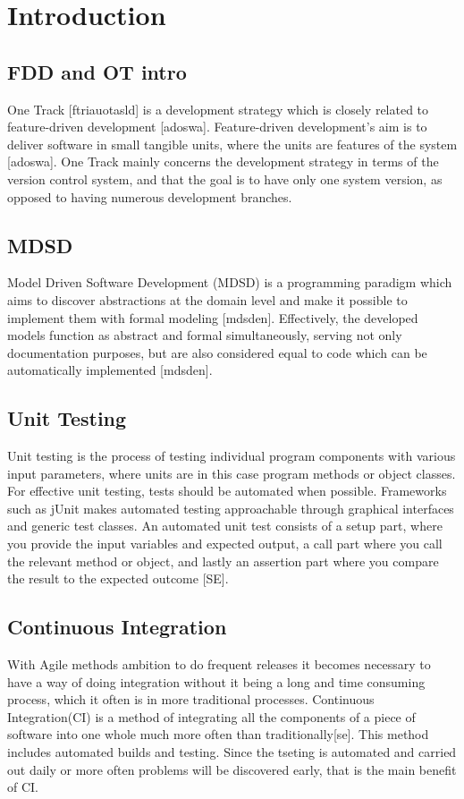 \documentclass[fina_report_innit.tex]{subfiles}
\begin{document}
\section{Introduction}

\subsection*{FDD and OT intro}
One Track [ftriauotasld] is a development strategy which is closely related to feature-driven development [adoswa]. Feature-driven development's aim is to deliver software in small tangible units, where the units are features of the system [adoswa]. One Track mainly concerns the development strategy in terms of the version control system, and that the goal is to have only one system version, as opposed to having numerous development branches. 

\subsection*{MDSD}
Model Driven Software Development (MDSD) is a programming paradigm which aims to discover abstractions at the domain level and make it possible to implement them with formal modeling [mdsden]. Effectively, the developed models function as abstract and formal simultaneously, serving not only documentation purposes, but are also considered equal to code which can be automatically implemented [mdsden].

\subsection*{Unit Testing}
Unit testing is the process of testing individual program components with various input parameters, where units are in this case program methods or object classes.
For effective unit testing, tests should be automated when possible.  Frameworks such as jUnit makes automated testing approachable through graphical interfaces and generic test classes. An automated unit test consists of a setup part, where you provide the input variables and expected output, a call part where you call the relevant method or object, and lastly an assertion part where you compare the result to the expected outcome [SE]. 

\subsection*{Continuous Integration}
With Agile methods ambition to do frequent releases it becomes necessary to have a way of doing integration without it being a long and time consuming process, which it often is in more traditional processes. Continuous Integration(CI) is a method of integrating all the components of a piece of software into one whole much more often than traditionally[se]. This method includes automated builds and testing. Since the tseting is automated and carried out daily or more often problems will be discovered early, that is the main benefit of CI. 
\end{document}
